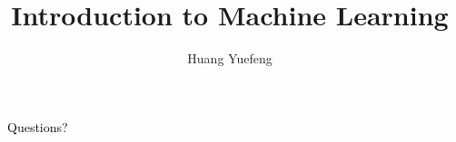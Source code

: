 
\def\allfiles{allfiles}

\author{Huang Yuefeng}
\title{Introduction to Machine Learning}




\frame{

	\titlepage
}
\setcounter{tocdepth}{1}

%













\begin{frame}
\
\centering \Large \textcolor{black}{Questions?}

\end{frame}
\usebackgroundtemplate{}




